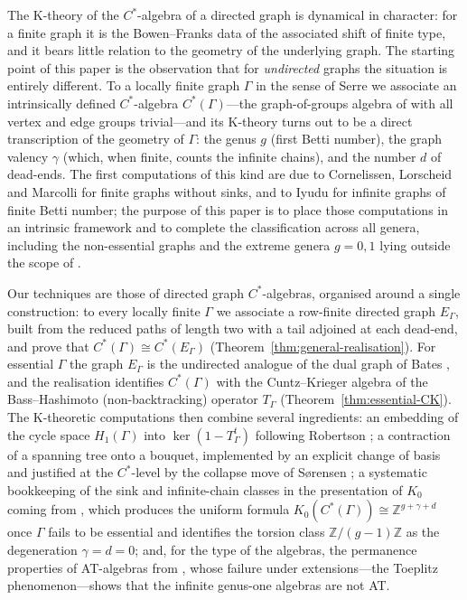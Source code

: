 \documentclass[12pt,reqno]{amsart}
\theoremstyle{plain}
\theoremstyle{definition}
\newcommand{\Z}{\mathbb{Z}}
\begin{document}
The K-theory of the $C^*$-algebra of a directed graph is dynamical in character: for a finite
graph it is the Bowen--Franks data of the associated shift of finite type, and it bears little
relation to the geometry of the underlying graph. The starting point of this paper is the
observation that for \emph{undirected} graphs the situation is entirely different. To a locally
finite graph $\Gamma$ in the sense of Serre we associate an intrinsically defined $C^*$-algebra
$C^*(\Gamma)$---the graph-of-groups algebra of \cite{BMPST} with all vertex and edge groups
trivial---and its K-theory turns out to be a direct transcription of the geometry of $\Gamma$: the
genus $g$ \textup(first Betti number\textup), the graph valency $\gamma$ \textup(which, when
finite, counts the infinite chains\textup), and the number $d$ of dead-ends. The first computations of this kind are due to
Cornelissen, Lorscheid and Marcolli \cite{CLM} for finite graphs without sinks, and to Iyudu
\cite{Iyudu} for infinite graphs of finite Betti number; the purpose of this paper is to place
those computations in an intrinsic framework and to complete the classification across all genera,
including the non-essential graphs and the extreme genera $g=0,1$ lying outside the scope of
\cite{CLM,Iyudu}.

Our techniques are those of directed graph $C^*$-algebras, organised around a single construction:
to every locally finite $\Gamma$ we associate a row-finite directed graph $E_\Gamma$, built from
the reduced paths of length two with a tail adjoined at each dead-end, and prove that
$C^*(\Gamma)\cong C^*(E_\Gamma)$ \textup(Theorem~\ref{thm:general-realisation}\textup). For
essential $\Gamma$ the graph $E_\Gamma$ is the undirected analogue of the dual graph of Bates
\cite{Bates}, and the realisation identifies $C^*(\Gamma)$ with the Cuntz--Krieger algebra of the
Bass--Hashimoto \textup(non-backtracking\textup) operator $T_\Gamma$
\textup(Theorem~\ref{thm:essential-CK}\textup). The K-theoretic computations then combine several
ingredients: an embedding of the cycle space $H_1(\Gamma)$ into $\ker(1-T_\Gamma^{t})$ following
Robertson \cite{Robertson}; a contraction of a spanning tree onto a bouquet, implemented by an
explicit change of basis and justified at the $C^*$-level by the collapse move of S\o rensen
\cite{Sorensen}; a systematic bookkeeping of the sink and infinite-chain classes in the
presentation of $K_0$ coming from \cite{RS}, which produces the uniform formula
$K_0(C^*(\Gamma))\cong\Z^{g+\gamma+d}$ once $\Gamma$ fails to be essential and identifies the
torsion class $\Z/(g-1)\Z$ as the degeneration $\gamma=d=0$; and, for the type of the algebras, the
permanence properties of AT-algebras from \cite{Rordam}, whose failure under extensions---the
Toeplitz phenomenon---shows that the infinite genus-one algebras are not AT.
\end{document}
